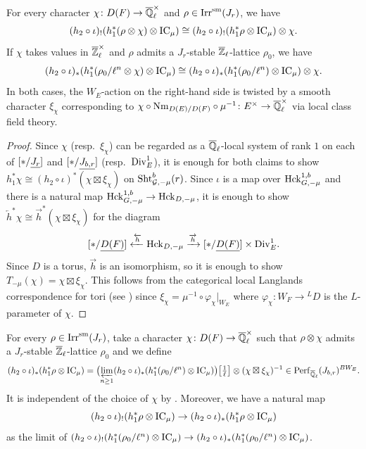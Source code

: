 \documentclass[12pt,reqno]{amsart}
\begin{document}
\begin{lem} \label{lem:twisting_D_character}
    For every character $\chi \colon D(F) \to {\overline{\mathbb{Q}}_\ell^\times}$ and $\rho \in {\operatorname{Irr}}^{\operatorname{sm}}(J_r)$, we have 
    \[
        (h_2 \circ \iota)_! (h_1^*(\rho \otimes \chi) \otimes {\operatorname{IC}}_\mu) \cong (h_2 \circ \iota)_! (h_1^*\rho \otimes {\operatorname{IC}}_\mu) \otimes \chi. 
    \]
    If $\chi$ takes values in ${\overline{\mathbb{Z}}}_\ell^\times$ and $\rho$ admits a $J_r$-stable ${\overline{\mathbb{Z}}}_\ell$-lattice $\rho_0$, we have 
    \[
        (h_2 \circ \iota)_* (h_1^*(\rho_0 / \ell^n \otimes \chi) \otimes {\operatorname{IC}}_\mu) \cong (h_2 \circ \iota)_* (h_1^*(\rho_0 / \ell^n) \otimes {\operatorname{IC}}_\mu) \otimes \chi.  
    \]
    In both cases, the $W_E$-action on the right-hand side is twisted by a smooth character $\xi_\chi$ corresponding to $\chi \circ {\operatorname{Nm}}_{D(E) / D(F)} \circ \mu^{-1} \colon E^\times \to {\overline{\mathbb{Q}}_\ell^\times}$ via local class field theory. 
\end{lem}
\begin{proof}
    Since $\chi$ (resp.\ $\xi_\chi$) can be regarded as a ${\overline{\mathbb{Q}}_\ell}$-local system of rank $1$ on each of $[\ast / {\underline{J_r}}]$ and $[\ast / {\underline{J_{b, r}}}]$ (resp.\ ${\operatorname{Div}}^1_E$), it is enough for both claims to show $h_1^*\chi \cong (h_2 \circ \iota)^* (\chi \boxtimes \xi_\chi)$ on ${\operatorname{Sht}}^b_{{\mathcal{G}}, -\mu}(r)$. Since $\iota$ is a map over ${\operatorname{Hck}}_{G, -\mu}^{1, b}$ and there is a natural map ${\operatorname{Hck}}_{G, -\mu}^{1, b} \to {\operatorname{Hck}}_{D, -\mu}$, it is enough to show $\overleftarrow{h}^*\chi \cong \overrightarrow{h}^*(\chi \boxtimes \xi_\chi)$ for the diagram
    \[
        [\ast / {\underline{D(F)}}] \xleftarrow{\overleftarrow{h}} {\operatorname{Hck}}_{D, -\mu} \xrightarrow{\overrightarrow{h}} [\ast / {\underline{D(F)}}] \times {\operatorname{Div}}^1_E. 
    \]
    Since $D$ is a torus, $\overrightarrow{h}$ is an isomorphism, so it is enough to show $T_{-\mu}(\chi) = \chi \boxtimes \xi_\chi$. This follows from the categorical local Langlands correspondence for tori (see \cite[Theorem 6.4.1]{Zou24}) since $\xi_\chi = \mu^{-1} \circ \varphi_\chi \vert_{W_E}$ where $\varphi_\chi \colon W_F \to {}^LD$ is the $L$-parameter of $\chi$.
\end{proof}

\begin{defi} \label{defi:map_from_!_to_*}
    For every $\rho \in {\operatorname{Irr}}^{\operatorname{sm}}(J_r)$, take a character $\chi \colon D(F) \to {\overline{\mathbb{Q}}_\ell^\times}$ such that $\rho \otimes \chi$ admits a $J_r$-stable ${\overline{\mathbb{Z}}}_\ell$-lattice $\rho_0$ and we define
    \[
        (h_2 \circ \iota)_* (h_1^*\rho \otimes {\operatorname{IC}}_\mu) = \bigl(\varprojlim_{n\geq 1} (h_2 \circ \iota)_* (h_1^*(\rho_0 / \ell^n) \otimes {\operatorname{IC}}_\mu) \bigr)\bigl[\tfrac{1}{\ell}\bigr] \otimes (\chi \boxtimes \xi_\chi)^{-1} \in {\operatorname{Perf}}_{{\overline{\mathbb{Q}}_\ell}}(J_{b, r})^{BW_E}. 
    \]
    It is independent of the choice of $\chi$ by . Moreover, we have a natural map 
    \begin{equation} \label{eq:compact_supp_and_ordinary}
        (h_2 \circ \iota)_! (h_1^*\rho \otimes {\operatorname{IC}}_\mu) \to (h_2 \circ \iota)_* (h_1^*\rho \otimes {\operatorname{IC}}_\mu)
    \end{equation}
    as the limit of $(h_2 \circ \iota)_! (h_1^*(\rho_0 / \ell^n) \otimes {\operatorname{IC}}_\mu) \to (h_2 \circ \iota)_* (h_1^*(\rho_0 / \ell^n) \otimes {\operatorname{IC}}_\mu)$. 
\end{defi}
\end{document}

